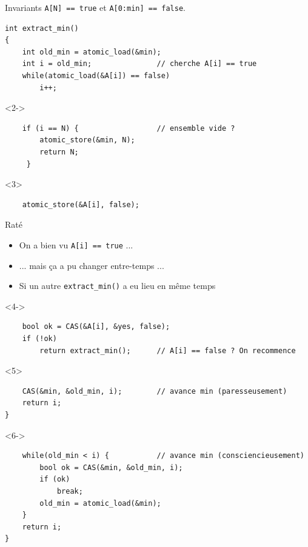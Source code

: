 \documentclass[xcolor={x11names,svgnames}]{beamer}
\begin{document}


\begin{frame}[fragile,label=lf_intset]

  \smallskip
  
\begin{alertblock}{Invariants}
  \texttt{A[N] == true} et \texttt{A[0:min] == false}.
\end{alertblock}

\begin{overlayarea}{\textwidth}{8cm}
\begin{verbatim}
int extract_min()
{
    int old_min = atomic_load(&min);
    int i = old_min;               // cherche A[i] == true
    while(atomic_load(&A[i]) == false)
        i++;
\end{verbatim}
\begin{onlyenv}<2->%
\begin{verbatim}
    if (i == N) {                  // ensemble vide ?
        atomic_store(&min, N);     
        return N;
     }
\end{verbatim}
\end{onlyenv}%
\begin{onlyenv}<3>
\begin{verbatim}
    atomic_store(&A[i], false);
  \end{verbatim}
  \begin{block}{Raté}
    \begin{itemize}
    \item On a bien vu \texttt{A[i] == true} ...
    \item ... mais ça a pu changer entre-temps ...
    \item Si un autre \texttt{extract\_min()} a eu lieu en même temps
    \end{itemize}
  \end{block}
\end{onlyenv}
\begin{onlyenv}<4->
\begin{verbatim}
    bool ok = CAS(&A[i], &yes, false);
    if (!ok)         
        return extract_min();      // A[i] == false ? On recommence   
\end{verbatim}
\end{onlyenv}
\begin{onlyenv}<5>
\begin{verbatim}
    CAS(&min, &old_min, i);        // avance min (paresseusement)
    return i;
}
\end{verbatim}
\end{onlyenv}
\begin{onlyenv}<6->
\begin{verbatim}
    while(old_min < i) {           // avance min (consciencieusement)
        bool ok = CAS(&min, &old_min, i);
        if (ok)
            break;
        old_min = atomic_load(&min);
    }
    return i;
}
\end{verbatim}
\end{onlyenv}
\end{overlayarea}

\end{frame}
\end{document}

